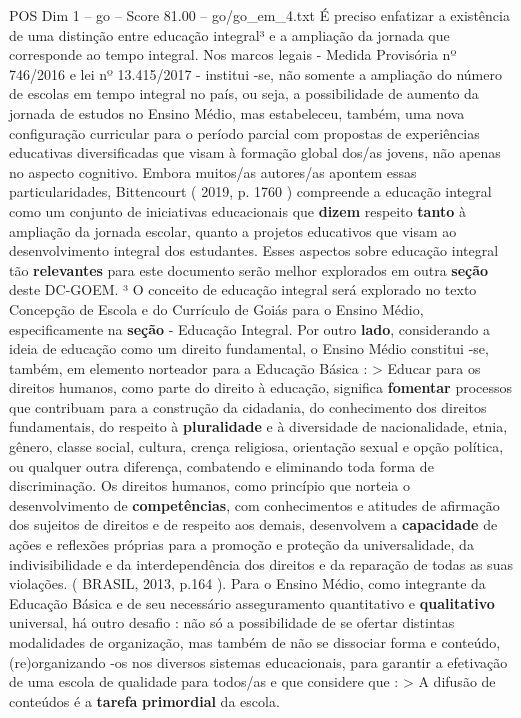 \begin{textsample}{POS Dim 1 – go – Score 81.00 – go/go\_em\_4.txt}
É preciso enfatizar a existência de uma distinção entre educação integral³ e a ampliação da jornada que corresponde ao tempo integral.
Nos marcos legais - Medida Provisória nº 746/2016 e lei nº 13.415/2017 - institui -se, não somente a ampliação do número de escolas em tempo integral no país, ou seja, a possibilidade de aumento da jornada de estudos no Ensino Médio, mas estabeleceu, também, uma nova configuração curricular para o período parcial com propostas de experiências educativas diversificadas que visam à formação global dos/as jovens, não apenas no aspecto cognitivo.
Embora muitos/as autores/as apontem essas particularidades, Bittencourt ( 2019, p. 1760 ) compreende a educação integral como um conjunto de iniciativas educacionais que \textbf{dizem} respeito \textbf{tanto} à ampliação da jornada escolar, quanto a projetos educativos que visam ao desenvolvimento integral dos estudantes.
Esses aspectos sobre educação integral tão \textbf{relevantes} para este documento serão melhor explorados em outra \textbf{seção} deste DC-GOEM. ³ O conceito de educação integral será explorado no texto Concepção de Escola e do Currículo de Goiás para o Ensino Médio, especificamente na \textbf{seção} - Educação Integral.
Por outro \textbf{lado}, considerando a ideia de educação como um direito fundamental, o Ensino Médio constitui -se, também, em elemento norteador para a Educação Básica : > Educar para os direitos humanos, como parte do direito à educação, significa \textbf{fomentar} processos que contribuam para a construção da cidadania, do conhecimento dos direitos fundamentais, do respeito à \textbf{pluralidade} e à diversidade de nacionalidade, etnia, gênero, classe social, cultura, crença religiosa, orientação sexual e opção política, ou qualquer outra diferença, combatendo e eliminando toda forma de discriminação.
Os direitos humanos, como princípio que norteia o desenvolvimento de \textbf{competências}, com conhecimentos e atitudes de afirmação dos sujeitos de direitos e de respeito aos demais, desenvolvem a \textbf{capacidade} de ações e reflexões próprias para a promoção e proteção da universalidade, da indivisibilidade e da interdependência dos direitos e da reparação de todas as suas violações. ( BRASIL, 2013, p.164 ).
Para o Ensino Médio, como integrante da Educação Básica e de seu necessário asseguramento quantitativo e \textbf{qualitativo} universal, há outro desafio : não só a possibilidade de se ofertar distintas modalidades de organização, mas também de não se dissociar forma e conteúdo, (re)organizando -os nos diversos sistemas educacionais, para garantir a efetivação de uma escola de qualidade para todos/as e que considere que : > A difusão de conteúdos é a \textbf{tarefa} \textbf{primordial} da escola.

\end{textsample}
